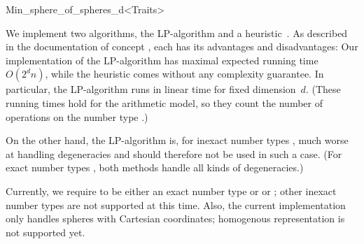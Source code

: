 \begin{ccRefClass}{Min_sphere_of_spheres_d<Traits>}
%

\ccImplementation
\ccIndexImplementation

We implement two algorithms, the LP-algorithm and a
heuristic~\cite{msw-sblp-92}.  As described in the documentation of
concept , each has its advantages and
disadvantages: Our implementation of the LP-algorithm has maximal
expected running time $O(2^d n)$, while the heuristic comes without
any complexity guarantee.  In particular, the LP-algorithm runs in
linear time for fixed dimension~$d$. (These running times hold for the
arithmetic model, so they count the number of operations on
the number type .)

On the other hand, the LP-algorithm is, for inexact number types
, much worse at handling degeneracies and should therefore not
be used in such a case.  (For exact number types
, both methods handle all kinds of degeneracies.)

Currently, we require  to be either an exact number
type or  or ; other inexact number types are
not supported at this time.  Also, the current implementation only
handles spheres with Cartesian coordinates; homogenous representation
is not supported yet.

\ccExample
{}

\end{ccRefClass}



